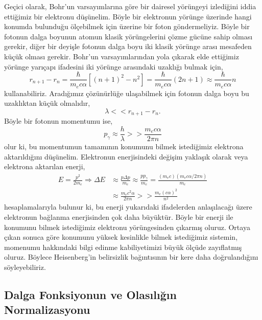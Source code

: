 \documentclass[a4paper,12pt, twoside]{article}
\begin{document}
Geçici olarak, Bohr'un varsayımlarına göre bir dairesel yörüngeyi izlediğini iddia ettiğimiz bir elektronu düşünelim. Böyle bir elektronun yörünge üzerinde hangi konumda bulunduğu ölçebilmek için üzerine bir foton göndermeliyiz. Böyle bir fotonun dalga boyunun atomun klasik yörüngelerini çözme gücüne sahip olması gerekir, diğer bir deyişle fotonun dalga boyu iki klasik yörünge arası mesafeden küçük olması gerekir. Bohr'un varsayımlarından yola çıkarak elde ettiğimiz yörünge yarıçapı ifadesini iki yörünge arasındaki uzaklığı bulmak için,
\begin{equation*}
r _ { n + 1 } - r _ { n } = \frac { \hbar } { m _ { e } c \alpha } \left[ ( n + 1 ) ^ { 2 } - n ^ { 2 } \right] = \frac { \hbar } { m _ { e } c \alpha } (2n+1) \approx \frac { \hbar } { m _ { e } c \alpha } n
\end{equation*}
kullanabiliriz. Aradığımız çözünürlüğe ulaşabilmek için fotonun dalga boyu bu uzaklıktan küçük olmalıdır,
\begin{equation*}
\lambda << r _ { n + 1 } - r _ { n }.
\end{equation*}
Böyle bir fotonun momentumu ise,
\begin{equation*}
p_{ \gamma } \approx \frac { h } { \lambda } >> \frac { m _ { e } c \alpha } { 2\pi n }
\end{equation*}
olur ki, bu momentumun tamamının konumunu bilmek istediğimiz elektrona aktarıldığını düşünelim. Elektronun enerjisindeki değişim yaklaşık olarak veya elektrona aktarılan enerji,
\begin{align*}
E = \frac{p^2}{2m_e} \Rightarrow \Delta E &\approx \frac { p \Delta p } { m _ { e } } \approx \frac { p p _ { \gamma } } { m _ { e } } = \frac{(m_e c) (m_e c \alpha/2\pi n)}{m_e}\\
&\approx \frac { m_e c^2 \alpha} { 2\pi n } >> \frac { m _ { e } ( c \alpha ) ^ { 2 } } { n ^ { 2 } }
\end{align*}
hesaplamalarıyla bulunur ki, bu enerji yukarıdaki ifadelerden anlaşılacağı üzere elektronun bağlanma enerjisinden çok daha büyüktür. Böyle bir enerji ile konumunu bilmek istediğimiz elektronu yörüngesinden çıkarmış oluruz. Ortaya çıkan sonuca göre konumunu yüksek kesinlikle bilmek istediğimiz sistemin, momenumu hakkındaki bilgi edinme kabiliyetimizi büyük ölçüde zayıflatmış oluruz. Böylece Heisenberg'in belirsizlik bağıntısının bir kere daha doğrulandığını söyleyebiliriz.

\subsection{Dalga Fonksiyonun ve Olasılığın Normalizasyonu}
\end{document}
